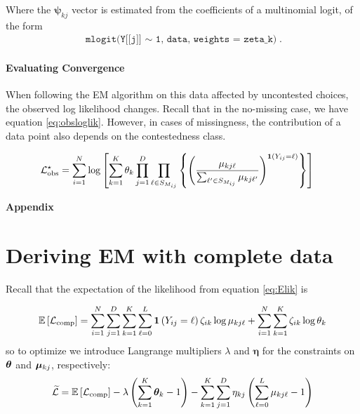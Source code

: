 \documentclass[11pt]{article}
\begin{document}
Where the \(\bm\psi_{kj}\) vector is estimated from the coefficients of a multinomial logit, of the form 
\begin{align*}
\texttt{mlogit(Y[[j]] \(\sim\) 1, data, weights = zeta\_k)}.
\end{align*}

\paragraph{Evaluating Convergence} When following the EM algorithm on this data affected by uncontested choices, the observed log likelihood changes. Recall that in the no-missing case,  we have equation \ref{eq:obsloglik}. However, in cases of missingness, the contribution of a data point also depends on the contestedness class.

\begin{align*}
{\mathcal{L}}^{\star}_{\text{obs}} &= \sum^{N}_{i=1}\log \left[\sum^{K}_{k=1}\theta_k \prod^{D}_{j=1}\prod_{\ell \in S_{M_{ij}}}\left\{\left(\frac{\mu_{kj\ell}}{\sum_{\ell^\prime \in S_{M_{ij}}} \mu_{kj\ell^\prime}}\right)^{\bm{1}\left(Y_{ij} = \ell\right)}\right\}\right]
\end{align*}


\newpage
\appendix

\begin{centering}
\textbf{\large{Appendix}}
\end{centering}

\section{Deriving EM with complete data}

Recall that the expectation of the likelihood from equation \ref{eq:Elik} is

\begin{align*}
\mathbb{E}\left[\mathcal{L}_{\text{comp}}\right] = \sum^{N}_{i=1}\sum^{D}_{j=1}\sum^{K}_{k=1}\sum^{L}_{\ell = 0}\bm{1}\left(Y_{ij} = \ell\right) \zeta_{ik}\log\mu_{kj\ell} +  
\sum^{N}_{i=1}\sum^{K}_{k=1}\zeta_{ik}\log \theta_{k}
\end{align*}
so to optimize we introduce Langrange multipliers \(\lambda\) and \(\bm{\eta}\) for the constraints on \(\bm{\theta}\) and \(\bm{\mu}_{kj}\), respectively:
\begin{align}
\widetilde{\mathcal{L}} = \mathbb{E}\left[\mathcal{L}_\text{comp}\right] - \lambda\left(\sum^{K}_{k=1}\bm{\theta}_k - 1\right) - \sum^{K}_{k=1}\sum^{D}_{j=1}\eta_{kj}\left(\sum^{L}_{\ell=0}\mu_{kj\ell} - 1\right)\label{eq:lagrange_a}
\end{align}
\end{document}
